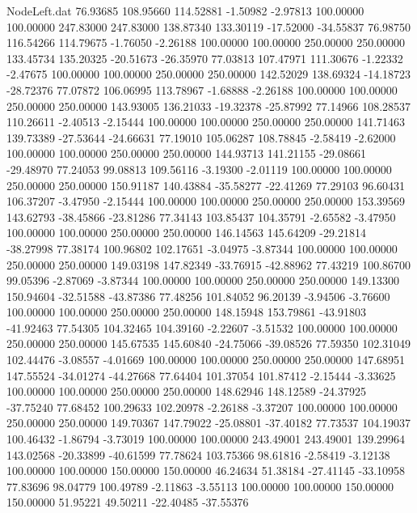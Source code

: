 \begin{filecontents}{NodeLeft.dat}
  76.93685  108.95660  114.52881    -1.50982   -2.97813  100.00000  100.00000  247.83000  247.83000  138.87340  133.30119  -17.52000  -34.55837
  76.98750  116.54266  114.79675    -1.76050   -2.26188  100.00000  100.00000  250.00000  250.00000  133.45734  135.20325  -20.51673  -26.35970
  77.03813  107.47971  111.30676    -1.22332   -2.47675  100.00000  100.00000  250.00000  250.00000  142.52029  138.69324  -14.18723  -28.72376
  77.07872  106.06995  113.78967    -1.68888   -2.26188  100.00000  100.00000  250.00000  250.00000  143.93005  136.21033  -19.32378  -25.87992
  77.14966  108.28537  110.26611    -2.40513   -2.15444  100.00000  100.00000  250.00000  250.00000  141.71463  139.73389  -27.53644  -24.66631
  77.19010  105.06287  108.78845    -2.58419   -2.62000  100.00000  100.00000  250.00000  250.00000  144.93713  141.21155  -29.08661  -29.48970
  77.24053   99.08813  109.56116    -3.19300   -2.01119  100.00000  100.00000  250.00000  250.00000  150.91187  140.43884  -35.58277  -22.41269
  77.29103   96.60431  106.37207    -3.47950   -2.15444  100.00000  100.00000  250.00000  250.00000  153.39569  143.62793  -38.45866  -23.81286
  77.34143  103.85437  104.35791    -2.65582   -3.47950  100.00000  100.00000  250.00000  250.00000  146.14563  145.64209  -29.21814  -38.27998
  77.38174  100.96802  102.17651    -3.04975   -3.87344  100.00000  100.00000  250.00000  250.00000  149.03198  147.82349  -33.76915  -42.88962
  77.43219  100.86700   99.05396    -2.87069   -3.87344  100.00000  100.00000  250.00000  250.00000  149.13300  150.94604  -32.51588  -43.87386
  77.48256  101.84052   96.20139    -3.94506   -3.76600  100.00000  100.00000  250.00000  250.00000  148.15948  153.79861  -43.91803  -41.92463
  77.54305  104.32465  104.39160    -2.22607   -3.51532  100.00000  100.00000  250.00000  250.00000  145.67535  145.60840  -24.75066  -39.08526
  77.59350  102.31049  102.44476    -3.08557   -4.01669  100.00000  100.00000  250.00000  250.00000  147.68951  147.55524  -34.01274  -44.27668
  77.64404  101.37054  101.87412    -2.15444   -3.33625  100.00000  100.00000  250.00000  250.00000  148.62946  148.12589  -24.37925  -37.75240
  77.68452  100.29633  102.20978    -2.26188   -3.37207  100.00000  100.00000  250.00000  250.00000  149.70367  147.79022  -25.08801  -37.40182
  77.73537  104.19037  100.46432    -1.86794   -3.73019  100.00000  100.00000  243.49001  243.49001  139.29964  143.02568  -20.33899  -40.61599
  77.78624  103.75366   98.61816    -2.58419   -3.12138  100.00000  100.00000  150.00000  150.00000   46.24634   51.38184  -27.41145  -33.10958
  77.83696   98.04779  100.49789    -2.11863   -3.55113  100.00000  100.00000  150.00000  150.00000   51.95221   49.50211  -22.40485  -37.55376

\end{filecontents}
